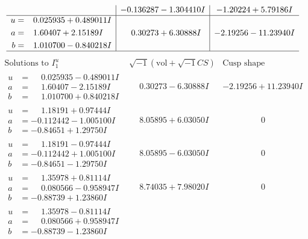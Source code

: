 \documentclass[1p]{elsarticle_modified}
\theoremstyle{definition}
\newcommand{\I}{\sqrt{-1}}
\begin{document}
$$\begin{array}{c|c|c}
 & -0.136287 - 1.304410 I & -1.20224 + 5.79186 I \\ \hline\begin{aligned}
u &= \phantom{-}0.025935 + 0.489011 I \\
a &= \phantom{-}1.60407 + 2.15189 I \\
b &= \phantom{-}1.010700 - 0.840218 I\end{aligned}
 & \phantom{-}0.30273 + 6.30888 I & -2.19256 - 11.23940 I\\
 \hline 
 \end{array}$$\newpage$$\begin{array}{c|c|c}  
\text{Solutions to }I^u_{1}& \I (\text{vol} + \sqrt{-1}CS) & \text{Cusp shape}\\
 \hline 
\begin{aligned}
u &= \phantom{-}0.025935 - 0.489011 I \\
a &= \phantom{-}1.60407 - 2.15189 I \\
b &= \phantom{-}1.010700 + 0.840218 I\end{aligned}
 & \phantom{-}0.30273 - 6.30888 I & -2.19256 + 11.23940 I \\ \hline\begin{aligned}
u &= \phantom{-}1.18191 + 0.97444 I \\
a &= -0.112442 - 1.005100 I \\
b &= -0.84651 + 1.29750 I\end{aligned}
 & \phantom{-}8.05895 + 6.03050 I & \phantom{-0.000000 } 0 \\ \hline\begin{aligned}
u &= \phantom{-}1.18191 - 0.97444 I \\
a &= -0.112442 + 1.005100 I \\
b &= -0.84651 - 1.29750 I\end{aligned}
 & \phantom{-}8.05895 - 6.03050 I & \phantom{-0.000000 } 0 \\ \hline\begin{aligned}
u &= \phantom{-}1.35978 + 0.81114 I \\
a &= \phantom{-}0.080566 - 0.958947 I \\
b &= -0.88739 + 1.23860 I\end{aligned}
 & \phantom{-}8.74035 + 7.98020 I & \phantom{-0.000000 } 0 \\ \hline\begin{aligned}
u &= \phantom{-}1.35978 - 0.81114 I \\
a &= \phantom{-}0.080566 + 0.958947 I \\
b &= -0.88739 - 1.23860 I\end{aligned}

\end{array}$$
\end{document}

